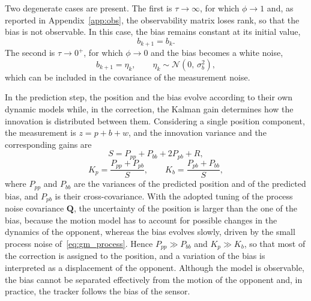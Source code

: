 Two degenerate cases are present. The first is $\tau \to \infty$, for which $\phi \to 1$
and, as reported in Appendix~\ref{app:obs}, the observability matrix loses rank, so that the
bias is not observable. In this case, the bias remains constant at its initial value,
\begin{equation}
    b_{k+1} = b_k.
\end{equation}
The second is $\tau \to 0^+$, for which $\phi \to 0$ and the bias becomes a white noise,
\begin{equation}
    b_{k+1} = \eta_k,
    \qquad
    \eta_k \sim \mathcal{N}\!\left(0,\, \sigma_b^2\right),
\end{equation}
which can be included in the covariance of the measurement noise.

In the prediction step, the position and the bias evolve according to their own dynamic
models while, in the correction, the Kalman gain determines how the innovation is
distributed between them. Considering a single
position component, the measurement is $z = p + b + w$, and the innovation variance and the
corresponding gains are
\begin{equation}
    S = P_{pp} + P_{bb} + 2P_{pb} + R,
    \label{eq:gm_innov_var}
\end{equation}
\begin{equation}
    K_p = \frac{P_{pp} + P_{pb}}{S},
    \qquad
    K_b = \frac{P_{pb} + P_{bb}}{S},
    \label{eq:gm_gains}
\end{equation}
where $P_{pp}$ and $P_{bb}$ are the variances of the predicted position and of the
predicted bias, and $P_{pb}$ is their cross-covariance. With the adopted tuning of the process
noise covariance $\mathbf{Q}$, the uncertainty of the position is larger than the one of the
bias, because the motion model has to account for possible
changes in the dynamics of the opponent, whereas the bias evolves slowly, driven by the
small process noise of~\eqref{eq:gm_process}. Hence $P_{pp} \gg P_{bb}$ and
$K_p \gg K_b$, so that most of the correction is assigned to the position, and a variation
of the bias is interpreted as a displacement of the opponent. Although the model is
observable, the bias cannot be separated effectively from the motion of the opponent and, in
practice, the tracker follows the bias of the sensor.


